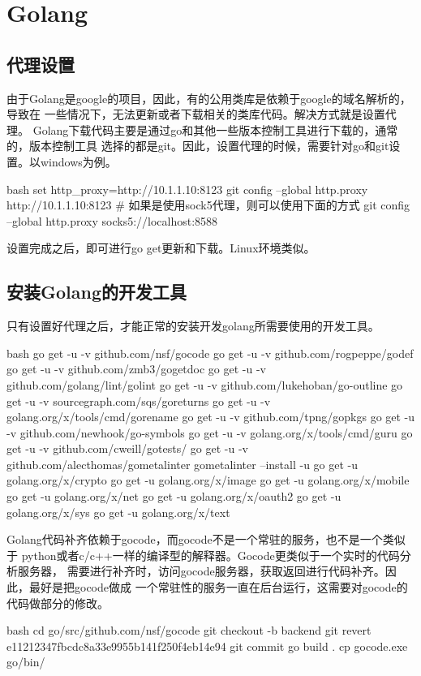 \chapter{Golang}

\section{代理设置}
由于Golang是google的项目，因此，有的公用类库是依赖于google的域名解析的，导致在
一些情况下，无法更新或者下载相关的类库代码。解决方式就是设置代理。
Golang下载代码主要是通过go和其他一些版本控制工具进行下载的，通常的，版本控制工具
选择的都是git。因此，设置代理的时候，需要针对go和git设置。以windows为例。
\begin{code-block}{bash}
set http_proxy=http://10.1.1.10:8123
git config --global http.proxy http://10.1.1.10:8123
# 如果是使用sock5代理，则可以使用下面的方式
git config --global http.proxy socks5://localhost:8588
\end{code-block}

设置完成之后，即可进行go get更新和下载。Linux环境类似。

\section{安装Golang的开发工具}
只有设置好代理之后，才能正常的安装开发golang所需要使用的开发工具。
\begin{code-block}{bash}
go get -u -v github.com/nsf/gocode
go get -u -v github.com/rogpeppe/godef
go get -u -v github.com/zmb3/gogetdoc
go get -u -v github.com/golang/lint/golint
go get -u -v github.com/lukehoban/go-outline
go get -u -v sourcegraph.com/sqs/goreturns
go get -u -v golang.org/x/tools/cmd/gorename
go get -u -v github.com/tpng/gopkgs
go get -u -v github.com/newhook/go-symbols
go get -u -v golang.org/x/tools/cmd/guru
go get -u -v github.com/cweill/gotests/
go get -u -v github.com/alecthomas/gometalinter
gometalinter --install -u
go get -u golang.org/x/crypto
go get -u golang.org/x/image
go get -u golang.org/x/mobile
go get -u golang.org/x/net
go get -u golang.org/x/oauth2
go get -u golang.org/x/sys
go get -u golang.org/x/text
\end{code-block}

Golang代码补齐依赖于gocode，而gocode不是一个常驻的服务，也不是一个类似于
python或者c/c++一样的编译型的解释器。Gocode更类似于一个实时的代码分析服务器，
需要进行补齐时，访问gocode服务器，获取返回进行代码补齐。因此，最好是把gocode做成
一个常驻性的服务一直在后台运行，这需要对gocode的代码做部分的修改。
\begin{code-block}{bash}
cd go/src/github.com/nsf/gocode
git checkout -b backend
git revert e11212347fbcdc8a33e9955b141f250f4eb14e94
git commit
go build .
cp gocode.exe go/bin/
\end{code-block}

